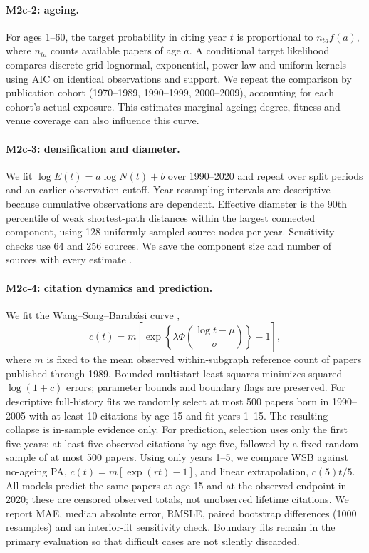 \paragraph{M2c-2: ageing.}
For ages 1--60, the target probability in citing year $t$ is proportional to
$n_{ta}f(a)$, where $n_{ta}$ counts available papers of age $a$.
A conditional target likelihood compares discrete-grid lognormal, exponential,
power-law and uniform kernels using AIC on identical observations and support.
We repeat the comparison by publication cohort (1970--1989, 1990--1999,
2000--2009), accounting for each cohort's actual exposure.
This estimates marginal ageing; degree, fitness and venue coverage can also
influence this curve.

\paragraph{M2c-3: densification and diameter.}
We fit $\log E(t)=a\log N(t)+b$ over 1990--2020 and repeat over split periods and
an earlier observation cutoff. Year-resampling intervals are descriptive because
cumulative observations are dependent.
Effective diameter is the 90th percentile of weak shortest-path distances
within the largest connected component, using 128 uniformly sampled source nodes
per year. Sensitivity checks use 64 and 256 sources. We save the component size
and number of sources with every estimate \citep{leskovec2005graphs}.

\paragraph{M2c-4: citation dynamics and prediction.}
We fit the Wang--Song--Barab\'asi curve \citep{wang2013quantifying},
\begin{equation}
 c(t)=m\left[\exp\!\left\{\lambda\Phi\left(\frac{\log t-\mu}{\sigma}\right)\right\}-1\right],
\end{equation}
where $m$ is fixed to the mean observed within-subgraph reference count of papers
published through 1989. Bounded multistart least squares minimizes squared
$\log(1+c)$ errors; parameter bounds and boundary flags are preserved.
For descriptive full-history fits we randomly select at most 500 papers born in
1990--2005 with at least 10 citations by age 15 and fit years 1--15. The resulting
collapse is in-sample evidence only.
For prediction, selection uses only the first five years: at least five observed
citations by age five, followed by a fixed random sample of at most 500 papers.
Using only years 1--5, we compare WSB against no-ageing PA,
$c(t)=m[\exp(rt)-1]$, and linear extrapolation, $c(5)t/5$.
All models predict the same papers at age 15 and at the observed endpoint in 2020;
these are censored observed totals, not unobserved lifetime citations.
We report MAE, median absolute error, RMSLE, paired bootstrap differences
(1000 resamples) and an interior-fit sensitivity check. Boundary fits remain in
the primary evaluation so that difficult cases are not silently discarded.


